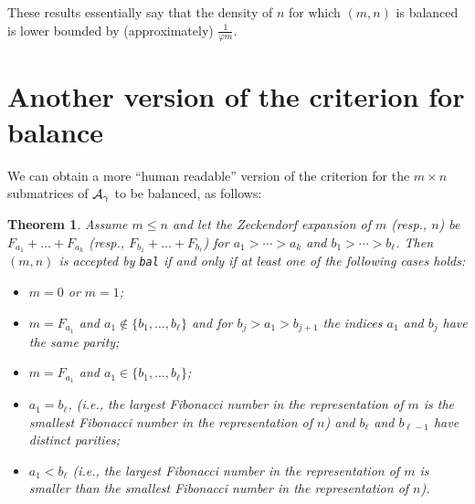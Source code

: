 \documentclass[final]{dmtcs-episciences}
\theoremstyle{plain}
\newtheorem{theorem}{Theorem}
\theoremstyle{remark}
\begin{document}
\noindent These results essentially say that the density of $n$
for which $(m,n)$ is balanced is lower bounded by (approximately)
$\frac{1}{\varphi m}$.

\section{Another version of the criterion for balance}

We can obtain a more ``human readable'' version of the criterion for the $m \times n$ submatrices of ${\cal A}_{\gamma}$ to be balanced, as follows:  

\begin{theorem}
Assume $m \leq n$ and let the Zeckendorf expansion of $m$ (resp., $n$) be $F_{a_1} + \dots + F_{a_k}$ (resp., $ F_{b_1} + \dots + F_{b_\ell}$) for $a_1 > \cdots >a_k$ and $b_1 > \cdots > b_\ell$.
Then $(m,n)$ is accepted by {\tt bal} if and only if at least one of the following cases holds:
\begin{itemize}
    \item[(a)] $m = 0$ or $m = 1$; 

    \item[(b)] $m = F_{a_1}$ and $a_1 \notin \{b_1, \ldots, b_\ell\}$ and for $b_j > a_1 > b_{j+1}$ the indices $a_1$ and $b_j$ have the same parity; 
    
    \item[(c)] $m = F_{a_1}$ and $a_1 \in \{b_1, \ldots, b_\ell\}$; 
    
    \item[(d)] $a_1 =  b_\ell$, (i.e., the largest Fibonacci number in the representation of $m$ is the smallest Fibonacci number in the representation of $n$)
	and $b_\ell$ and $b_{\ell-1}$ have distinct parities; 
     
    \item[(e)] $a_1 < b_\ell$ (i.e., the largest Fibonacci number in the representation of $m$ is smaller than the smallest Fibonacci number in the representation of $n$). 
\end{itemize}
\end{theorem}
\end{document}
